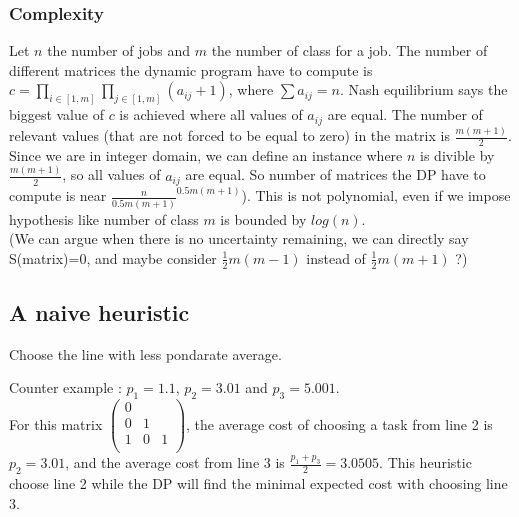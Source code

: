 \documentclass{article}
\begin{document}
\subsubsection*{Complexity}
Let $n$ the number of jobs and $m$ the number of class for a job. The number of different matrices the dynamic program have to compute is $c=\prod_{i\in[1,m]}\prod_{j\in[1,m]}\left(a_{ij}+1\right)$, where $\sum a_{ij}=n$. Nash equilibrium says the biggest value of $c$ is achieved where all values of $a_{ij}$ are equal. The number of relevant values (that are not forced to be equal to zero) in the matrix is $\frac{m(m+1)}{2}$. Since we are in integer domain, we can define an instance where $n$ is divible by $\frac{m(m+1)}{2}$, so all values of $a_{ij}$ are equal. So number of matrices the DP have to compute is near $\frac{n}{0.5m(m+1)}^{0.5m(m+1)}$). This is not polynomial, even if we impose hypothesis like number of class $m$ is bounded by $log(n)$.\\
(We can argue when there is no uncertainty remaining, we can directly say S(matrix)=0, and maybe consider $\frac{1}{2}m(m-1)$ instead of $\frac{1}{2}m(m+1)$ ?)


\subsection{A naive heuristic}
Choose the line with less pondarate average.

Counter example : $p_1 = 1.1$, $p_2 = 3.01$ and $p_3=5.001$.\\
For this matrix $\begin{pmatrix}
            0 &   &   \\
            0 & 1 &   \\ 
            1 & 0 & 1 \\
        \end{pmatrix}$, the average cost of choosing a task from line 2 is $p_2=3.01$, and the average cost from line 3 is $\frac{p_1+p_3}{2}=3.0505$. This heuristic choose line 2 while the DP will find the minimal expected cost with choosing line 3.
 
\end{document}
